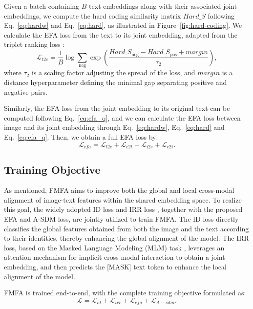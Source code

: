 \documentclass[acmsmall]{acmart}
\begin{document}
Given a batch containing $B$ text embeddings along with their
associated joint embeddings, we compute the hard coding similarity
matrix $Hard\_S$ following Eq.~\eqref{eq:hardw} and
Eq.~\eqref{eq:hard}, as illustrated in Figure~\ref{fig:hard-coding}.
We calculate the EFA loss from the text to its joint embedding,
adapted from the triplet ranking loss \cite{schroff2015facenet}:
\begin{equation}
    \mathcal{L}_{t2e}=\frac{1}{B}\log\sum_\mathrm{neg}\exp\left(\frac{Hard\_S_\mathrm{neg}-Hard\_S_\mathrm{pos}+margin}{\tau_2}\right),
    \label{eq:efa_q}
\end{equation}
where $\tau_2$ is a scaling factor adjusting the spread of the loss,
and $margin$ is a distance hyperparameter defining the minimal gap
separating positive and negative pairs.

Similarly, the EFA loss from the joint embedding to its original
text can be computed following Eq.~\eqref{eq:efa_q}, and we can
calculate the EFA loss between image and its joint embedding
through Eq.~\eqref{eq:hardw}, Eq.~\eqref{eq:hard} and
Eq.~\eqref{eq:efa_q}. Then, we obtain a full EFA loss by:
\begin{equation}
    \mathcal{L}_{efa}=\mathcal{L}_{t2e}+\mathcal{L}_{e2t}+\mathcal{L}_{i2e}+\mathcal{L}_{e2i}.
\end{equation}

\subsection{Training Objective}

As mentioned, FMFA aims to improve both the global and local cross-modal alignment of image-text features within the shared embedding space. To realize this goal, the widely adopted ID loss
\cite{zheng2020dual} and IRR loss \cite{jiang2023cross}, together
with the proposed EFA and A-SDM loss, are jointly utilized
to train FMFA. The ID loss directly classifies the global features obtained from both the image and the text according to their identities, thereby enhancing the global alignment of the model. The
IRR loss, based on the Masked Language Modeling (MLM) task
\cite{taylor1953cloze}, leverages an attention mechanism for
implicit cross-modal interaction to obtain a joint embedding, and
then predicts the [MASK] text token to enhance the local alignment
of the model.

FMFA is trained end-to-end, with the complete training objective
formulated as:
\begin{equation}
    \mathcal{L}=\mathcal{L}_{id}+\mathcal{L}_{irr}+\mathcal{L}_{efa}+\mathcal{L}_{A-sdm}.
\end{equation}
\end{document}
